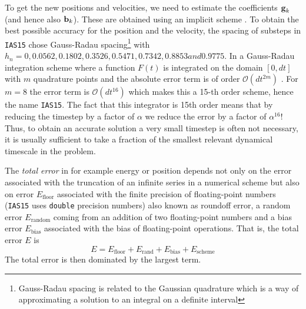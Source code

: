 \documentclass[ twoside,openright,titlepage,numbers=noenddot,headinclude,%
                footinclude=true,cleardoublepage=empty,abstractoff, %
                BCOR=5mm,paper=a4,fontsize=11pt,%
                american,%
                ]{scrreprt}
\begin{document}
To get the new positions and velocities, we need to estimate the coefficients
$\boldsymbol{\mathbf{g}}_k$ (and hence also $\boldsymbol{\mathbf{b}}_k$). These are obtained using an implicit
scheme
\citep[see][for details]{Rein2014}. To obtain the best possible accuracy for
the position and the velocity, the spacing of substeps in \texttt{IAS15} 
\cite{Rein2014} chose Gauss-Radau spacing\footnote{Gauss-Radau spacing is related to 
the Gaussian quadrature which is a way of approximating a solution to an 
integral on a definite interval} with $h_n=0, 0.0562, 0.1802, 0.3526, 
0.5471, 0.7342, 0.8853 and 0.9775$. In a Gauss-Radau integration scheme
where a function $F(t)$ is integrated on the domain $[0,dt]$ with $m$ quadrature
points and the absolute error term is of order $\mathcal{O}(dt^{2m})$
\cite{Rein2014}. 
For $m=8$ the error term is $\mathcal{O}(dt^{16})$ which makes this
a 15-th order scheme, hence the name \texttt{IAS15}. The fact that this
integrator is 15th order means that by reducing the timestep by a factor of
$\alpha$ we reduce the error by a factor of $\alpha^{16}$! Thus, to obtain
an accurate solution a very small timestep is often not necessary, it is
usually sufficient to take a fraction of the smallest relevant dynamical
timescale in the problem.

The \emph{total error} in for example energy or position 
depends not only on the error associated
with the truncation of an infinite series in a numerical scheme but also
on error $E_\text{floor}$ associated with the finite precision of 
floating-point numbers 
(\texttt{IAS15} uses \texttt{double} precision numbers) also known as
roundoff error, a random error 
$E_\text{random}$ coming from an addition of two floating-point numbers 
and a bias error $E_\text{bias}$ associated
with the bias of floating-point operations. That is, the total error $E$ is
\begin{equation}
    E=E_\text{floor}+E_\text{rand}+E_\text{bias}+E_\text{scheme}
\end{equation}
The total error is then dominated by the largest term. 
\end{document}
